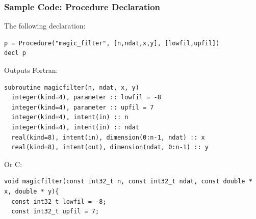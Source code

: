 \documentclass{beamer}
\begin{document}
\begin{frame}[fragile]
\frametitle{Sample Code: Procedure Declaration}
The following declaration:
\tiny
{}
\begin{lstlisting}
p = Procedure("magic_filter", [n,ndat,x,y], [lowfil,upfil])
decl p
\end{lstlisting}
\normalsize 
Outputs Fortran:
\tiny
{}
\begin{lstlisting}
subroutine magicfilter(n, ndat, x, y)
  integer(kind=4), parameter :: lowfil = -8
  integer(kind=4), parameter :: upfil = 7
  integer(kind=4), intent(in) :: n
  integer(kind=4), intent(in) :: ndat
  real(kind=8), intent(in), dimension(0:n-1, ndat) :: x
  real(kind=8), intent(out), dimension(ndat, 0:n-1) :: y
\end{lstlisting}
\normalsize
Or C:
\tiny
{}
\begin{lstlisting}
void magicfilter(const int32_t n, const int32_t ndat, const double * x, double * y){
  const int32_t lowfil = -8;
  const int32_t upfil = 7;
\end{lstlisting}
\end{frame}
\end{document}
